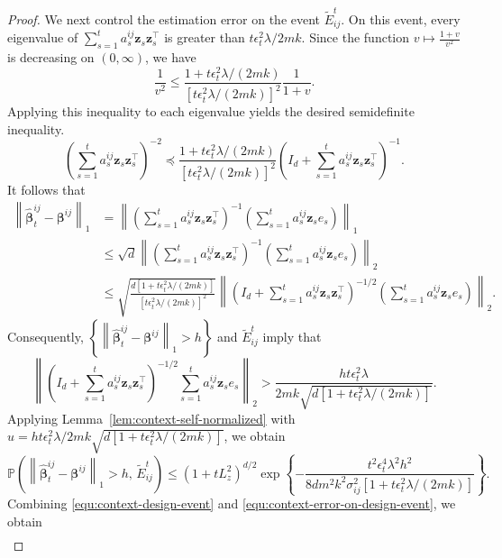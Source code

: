 \documentclass[12pt]{article}
\begin{document}
\begin{proof}
We next control the estimation error on the event $\widetilde E_{ij}^t$. On this event, every eigenvalue of $\sum_{s=1}^t a_s^{ij}\bm z_s\bm z_s^\top$ is greater than ${t\epsilon_t^2\lambda}/{2mk}$.
Since the function $v\mapsto\frac{1+v}{v^2}$ is decreasing on $(0,\infty)$, we have
\[
\frac{1}{v^2}
\le
\frac{
1+t\epsilon_t^2\lambda/(2mk)
}{
\left[
t\epsilon_t^2\lambda/(2mk)
\right]^2
}
\frac{1}{1+v}.
\]
Applying this inequality to each eigenvalue yields the desired
semidefinite inequality.
\[
\left(
\sum_{s=1}^t a_s^{ij}\bm z_s\bm z_s^\top
\right)^{-2}
\preceq
\frac{
1+t\epsilon_t^2\lambda/(2mk)
}{
\left[
t\epsilon_t^2\lambda/(2mk)
\right]^2
}
\left(
I_d+\sum_{s=1}^t a_s^{ij}\bm z_s\bm z_s^\top
\right)^{-1}.
\]
It follows that
\begin{align*}
\left\|
\widehat{\bm\beta}_t^{ij}
-
\bm\beta^{ij}
\right\|_1
&=
\left\|
\left(
\sum_{s=1}^t a_s^{ij}\bm z_s\bm z_s^\top
\right)^{-1}
\left( \sum_{s=1}^t a_s^{ij}\bm z_s e_s \right)
\right\|_1
\\
&\le
\sqrt d
\left\|
\left(
\sum_{s=1}^t a_s^{ij}\bm z_s\bm z_s^\top
\right)^{-1}
\left( \sum_{s=1}^t a_s^{ij}\bm z_s e_s \right)
\right\|_2
\\
&\le
\sqrt{
\frac{
d\left[
1+t\epsilon_t^2\lambda/(2mk)
\right]
}{
\left[
t\epsilon_t^2\lambda/(2mk)
\right]^2
}
}
\left\|
\left(
I_d+\sum_{s=1}^t a_s^{ij}\bm z_s\bm z_s^\top
\right)^{-1/2}
\left( \sum_{s=1}^t a_s^{ij}\bm z_s e_s \right)
\right\|_2.
\end{align*}
Consequently, $\left\{\left\|\widehat{\bm\beta}_t^{ij}-\bm\beta^{ij}\right\|_1>h\right\}$ and $\widetilde E_{ij}^t$ imply that
\[
\left\|
\left(
I_d+\sum_{s=1}^t a_s^{ij}\bm z_s\bm z_s^\top
\right)^{-1/2}
\sum_{s=1}^t a_s^{ij}\bm z_s e_s
\right\|_2
>
\frac{
h t\epsilon_t^2\lambda
}{
2mk
\sqrt{
d\left[
1+t\epsilon_t^2\lambda/(2mk)
\right]
}
}.
\]
Applying Lemma~\ref{lem:context-self-normalized} with 
$u = {
h t\epsilon_t^2\lambda}/{2mk
\sqrt{
d\left[
1+t\epsilon_t^2\lambda/(2mk)
\right]}}$,
we obtain
\begin{equation}
\label{equ:context-error-on-design-event}
\mathbb P\left(
\left\|
\widehat{\bm\beta}_t^{ij}
-
\bm\beta^{ij}
\right\|_1
>
h,
\,
\widetilde E_{ij}^t
\right)
\nonumber \le
\left(
1+tL_z^2
\right)^{d/2}
\exp\left\{
-
\frac{
t^2\epsilon_t^4\lambda^2h^2
}{
8dm^2k^2\sigma_{ij}^2
\left[
1+t\epsilon_t^2\lambda/(2mk)
\right]
}
\right\}.
\end{equation}
Combining \eqref{equ:context-design-event} and \eqref{equ:context-error-on-design-event}, we obtain
\begin{align*}

\end{align*}
\end{proof}
\end{document}
